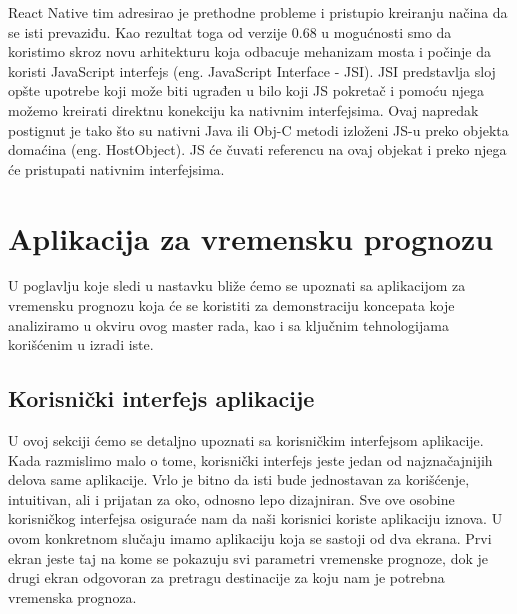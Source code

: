 \documentclass[12pt,oneside]{memoir}
\begin{document}
React Native tim adresirao je prethodne probleme i pristupio kreiranju načina da se isti prevaziđu. Kao rezultat toga od verzije 0.68 u mogućnosti smo da koristimo skroz novu arhitekturu koja odbacuje mehanizam mosta i počinje da koristi JavaScript interfejs (eng. JavaScript Interface - JSI). JSI predstavlja sloj opšte upotrebe koji može biti ugrađen u bilo koji JS pokretač i pomoću njega možemo kreirati direktnu konekciju ka nativnim interfejsima. Ovaj napredak postignut je tako što su nativni Java ili Obj-C metodi izloženi JS-u preko objekta domaćina (eng. HostObject). JS će čuvati referencu na ovaj objekat i preko njega će pristupati nativnim interfejsima.

\chapter{Aplikacija za vremensku prognozu}

U poglavlju koje sledi u nastavku bliže ćemo se upoznati sa aplikacijom za vremensku prognozu koja će se koristiti za demonstraciju koncepata koje analiziramo u okviru ovog master rada, kao i sa ključnim tehnologijama korišćenim u izradi iste.

\section{Korisnički interfejs aplikacije}

U ovoj sekciji ćemo se detaljno upoznati sa korisničkim interfejsom aplikacije. Kada razmislimo malo o tome, korisnički interfejs jeste jedan od najznačajnijih delova same aplikacije. Vrlo je bitno da isti bude jednostavan za korišćenje, intuitivan, ali i prijatan za oko, odnosno lepo dizajniran. Sve ove osobine korisničkog interfejsa osiguraće nam da naši korisnici koriste aplikaciju iznova. U ovom konkretnom slučaju imamo aplikaciju koja se sastoji od dva ekrana. Prvi ekran jeste taj na kome se pokazuju svi parametri vremenske prognoze, dok je drugi ekran odgovoran za pretragu destinacije za koju nam je potrebna vremenska prognoza.
\end{document}
